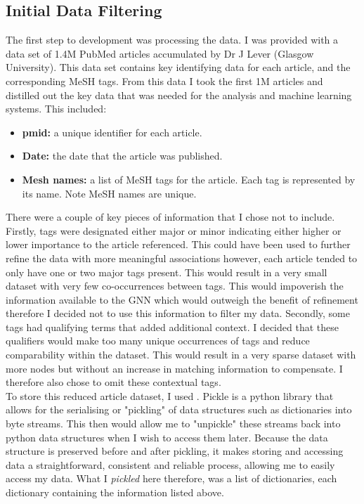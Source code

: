 \documentclass{l4proj}
\begin{document}
\subsection{Initial Data Filtering}

The first step to development was processing the data. I was provided with a data set of 1.4M PubMed articles accumulated by Dr J Lever (Glasgow University). This data set contains key identifying data for each article, and the corresponding MeSH tags. From this data I took the first 1M articles and distilled out the key data that was needed for the analysis and machine learning systems. This included:
\\
\begin{itemize}
    \item \textbf{pmid:} a unique identifier for each article.
    \item \textbf{Date:} the date that the article was published.
    \item \textbf{Mesh names:} a list of MeSH tags for the article. Each tag is represented by its name. Note MeSH names are unique.\\
\end{itemize}

There were a couple of key pieces of information that I chose not to include. Firstly, tags were designated either major or minor indicating either higher or lower importance to the article referenced. This could have been used to further refine the data with more meaningful associations however, each article tended to only have one or two major tags present. This would result in a very small dataset with very few co-occurrences between tags. This would impoverish the information available to the GNN which would outweigh the benefit of refinement therefore I decided not to use this information to filter my data. Secondly, some tags had qualifying terms that added additional context. I decided that these qualifiers would make too many unique occurrences of tags and reduce comparability within the dataset. This would result in a very sparse dataset with  more nodes but without an increase in matching information to compensate. I therefore also chose to omit these contextual tags.\\

To store this reduced article dataset, I used \cite{pickle}. Pickle is a python library that allows for the serialising or "pickling" of data structures such as dictionaries into byte streams. This then would allow me to "unpickle" these streams back into python data structures when I wish to access them later. Because the data structure is preserved before and after pickling, it makes storing and accessing data a straightforward, consistent and reliable process, allowing me to easily access my data. What I \textit{pickled} here therefore, was a list of dictionaries, each dictionary containing the information listed above.\\
\end{document}

